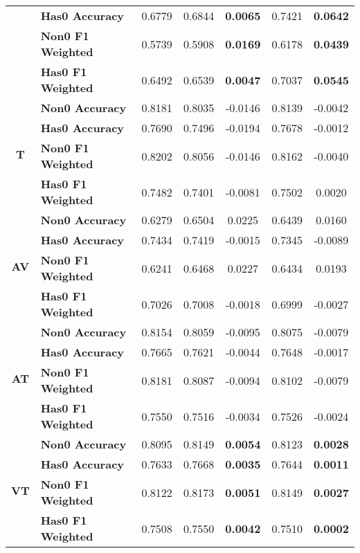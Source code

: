 \begin{table}[]
{\begin{tabular}{cl|ccccc}
                             & \textbf{Has0 Accuracy}    & 0.6779 & 0.6844 & \textbf{0.0065}  & 0.7421 & \textbf{0.0642} \\
                             & \textbf{Non0 F1 Weighted} & 0.5739 & 0.5908 & \textbf{0.0169}  & 0.6178 & \textbf{0.0439} \\
                             & \textbf{Has0 F1 Weighted} & 0.6492 & 0.6539 & \textbf{0.0047}  & 0.7037 & \textbf{0.0545} \\ \hline
\multirow{4}{*}{\textbf{T}}  & \textbf{Non0 Accuracy}    & 0.8181 & 0.8035 & -0.0146          & 0.8139 & -0.0042         \\
                             & \textbf{Has0 Accuracy}    & 0.7690 & 0.7496 & -0.0194          & 0.7678 & -0.0012         \\
                             & \textbf{Non0 F1 Weighted} & 0.8202 & 0.8056 & -0.0146          & 0.8162 & -0.0040         \\
                             & \textbf{Has0 F1 Weighted} & 0.7482 & 0.7401 & -0.0081          & 0.7502 & 0.0020          \\ \hline
\multirow{4}{*}{\textbf{AV}} & \textbf{Non0 Accuracy}    & 0.6279 & 0.6504 & 0.0225           & 0.6439 & 0.0160          \\
                             & \textbf{Has0 Accuracy}    & 0.7434 & 0.7419 & -0.0015          & 0.7345 & -0.0089         \\
                             & \textbf{Non0 F1 Weighted} & 0.6241 & 0.6468 & 0.0227           & 0.6434 & 0.0193          \\
                             & \textbf{Has0 F1 Weighted} & 0.7026 & 0.7008 & -0.0018          & 0.6999 & -0.0027         \\ \hline
\multirow{4}{*}{\textbf{AT}} & \textbf{Non0 Accuracy}    & 0.8154 & 0.8059 & -0.0095          & 0.8075 & -0.0079         \\
                             & \textbf{Has0 Accuracy}    & 0.7665 & 0.7621 & -0.0044          & 0.7648 & -0.0017         \\
                             & \textbf{Non0 F1 Weighted} & 0.8181 & 0.8087 & -0.0094          & 0.8102 & -0.0079         \\
                             & \textbf{Has0 F1 Weighted} & 0.7550 & 0.7516 & -0.0034          & 0.7526 & -0.0024         \\ \hline
\multirow{4}{*}{\textbf{VT}} & \textbf{Non0 Accuracy}    & 0.8095 & 0.8149 & \textbf{0.0054}  & 0.8123 & \textbf{0.0028} \\
                             & \textbf{Has0 Accuracy}    & 0.7633 & 0.7668 & \textbf{0.0035}  & 0.7644 & \textbf{0.0011} \\
                             & \textbf{Non0 F1 Weighted} & 0.8122 & 0.8173 & \textbf{0.0051}  & 0.8149 & \textbf{0.0027} \\
                             & \textbf{Has0 F1 Weighted} & 0.7508 & 0.7550 & \textbf{0.0042}  & 0.7510 & \textbf{0.0002} \\ \hline
\end{tabular}%
}
\end{table}

